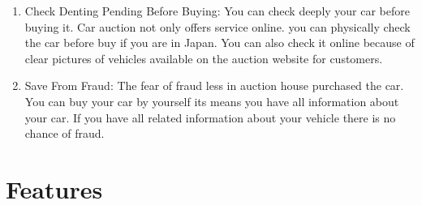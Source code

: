 \documentclass{report}
\begin{document}
\begin{enumerate}
\item Check Denting Pending Before Buying:  You can check deeply your car before buying it. Car auction not only offers service online. you can physically check the car before buy if you are in Japan. You can also check it online because of clear pictures of vehicles available on the auction website for customers.
\item Save From Fraud: The fear of fraud less in auction house purchased the car. You can buy your car by yourself its means you have all information about your car. If you have all related information about your vehicle there is no chance of fraud.

\end{enumerate}

\section*{Features}
\end{document}
